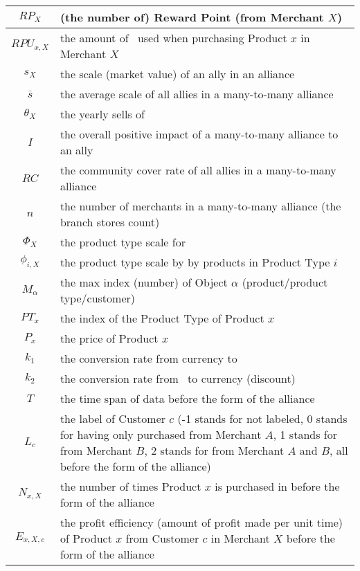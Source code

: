 \begin{table}[H]
\begin{tabularx}{\textwidth}{cX}
	\toprule
	$RP_X$ & (the number of) Reward Point (from Merchant $X$) \\
	\midrule
	$RPU_{x,X}$ & the amount of \RPd\ used when purchasing Product $x$ in Merchant $X$ \\
	\midrule
	$s_X$ & the scale (market value) of an ally in an alliance \\
	\midrule
	$\overline{s}$ & the average scale of all allies in a many-to-many alliance \\
	\midrule
	$\theta_X$ & the yearly sells of \X{X} \\
	\midrule
	$I$ & the overall positive impact of a many-to-many alliance to an ally \\
	\midrule
	$RC$ & the community cover rate of all allies in a many-to-many alliance \\
	\midrule
	$n$ & the number of merchants in a many-to-many alliance (the branch stores count)\\
	\midrule
	$\Phi_{X}$ & the product type scale for \X{X}\\
	\midrule
	$\phi_{i,X}$ & the product type scale by \X{X} by products in Product Type $i$ \\
	\midrule
	$M_\alpha$ & the max index (number) of Object $\alpha$ (product/product type/customer) \\
	\midrule
	$PT_x$ & the index of the Product Type of Product $x$ \\
	\midrule
	$P_x$ & the price of Product $x$ \\
	\midrule
	$k_1$ & the conversion rate from currency to \RPd \\
	\midrule
	$k_2$ & the conversion rate from \RPd\ to currency (discount) \\
	\midrule
	$T$ & the time span of data before the form of the alliance \\
	\midrule
	$L_c$ & the label of Customer $c$ \newline (-1 stands for not labeled, 0 stands for having only purchased from Merchant $A$, 1 stands for from Merchant $B$, 2 stands for from Merchant $A$ and $B$, all before the form of the alliance) \\
	\midrule
	$N_{x,X}$ & the number of times Product $x$ is purchased in \X{X} before the form of the alliance \\
	\midrule
	$E_{x,X,c}$ & the profit efficiency (amount of profit made per unit time) of Product $x$ from Customer $c$ in Merchant $X$ before the form of the alliance \\

\end{tabularx}
\end{table}

